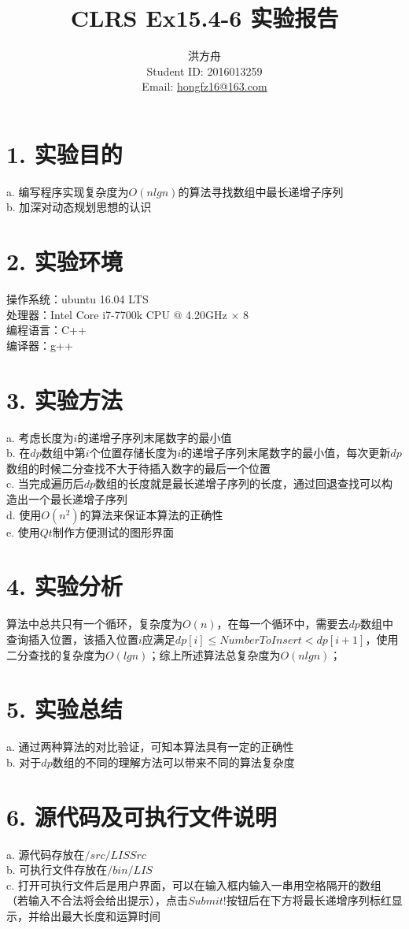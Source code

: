 \documentclass[12pt]{article}
\title{CLRS Ex15.4-6 实验报告}
\author{洪方舟\\Student ID: 2016013259\\Email: \href{mailto:hongfz16@163.com}{hongfz16@163.com}}
\begin{document}
  \maketitle
  \section*{1. 实验目的}
  a. 编写程序实现复杂度为$O(nlgn)$的算法寻找数组中最长递增子序列\\
  b. 加深对动态规划思想的认识
  \section*{2. 实验环境}
  操作系统：ubuntu 16.04 LTS\\
  处理器：Intel Core i7-7700k CPU @ 4.20GHz $\times$ 8\\
  编程语言：C++\\
  编译器：g++
  \section*{3. 实验方法}
  a. 考虑长度为$i$的递增子序列末尾数字的最小值\\
  b. 在$dp$数组中第$i$个位置存储长度为$i$的递增子序列末尾数字的最小值，每次更新$dp$数组的时候二分查找不大于待插入数字的最后一个位置\\
  c. 当完成遍历后$dp$数组的长度就是最长递增子序列的长度，通过回退查找可以构造出一个最长递增子序列\\
  d. 使用$O(n^2)$的算法来保证本算法的正确性\\
  e. 使用$Qt$制作方便测试的图形界面
  \section*{4. 实验分析}
  算法中总共只有一个循环，复杂度为$O(n)$，在每一个循环中，需要去$dp$数组中查询插入位置，该插入位置$i$应满足$dp[i]\leq NumberToInsert<dp[i+1]$，使用二分查找的复杂度为$O(lgn)$；综上所述算法总复杂度为$O(nlgn)$；
  \section*{5. 实验总结}
  a. 通过两种算法的对比验证，可知本算法具有一定的正确性\\
  b. 对于$dp$数组的不同的理解方法可以带来不同的算法复杂度
  \section*{6. 源代码及可执行文件说明}
  a. 源代码存放在$/src/LISSrc$\\
  b. 可执行文件存放在$/bin/LIS$\\
  c. 打开可执行文件后是用户界面，可以在输入框内输入一串用空格隔开的数组（若输入不合法将会给出提示），点击$Submit!$按钮后在下方将最长递增序列标红显示，并给出最大长度和运算时间
\end{document}
